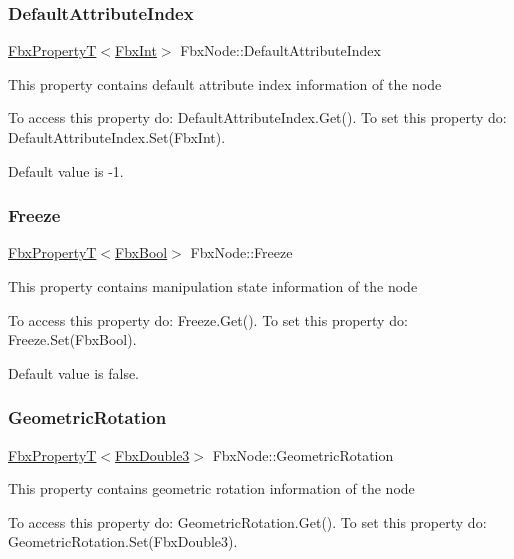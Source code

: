 \subsubsection{\texorpdfstring{Default\+Attribute\+Index}{DefaultAttributeIndex}}
{\footnotesize\ttfamily \hyperlink{class_fbx_property_t}{Fbx\+PropertyT}$<$\hyperlink{fbxtypes_8h_a088fa96de3b0b3ea69f0f6afef525dfb}{Fbx\+Int}$>$ Fbx\+Node\+::\+Default\+Attribute\+Index}

This property contains default attribute index information of the node

To access this property do\+: Default\+Attribute\+Index.\+Get(). To set this property do\+: Default\+Attribute\+Index.\+Set(\+Fbx\+Int).

Default value is -\/1. \mbox{\label{class_fbx_node_a473f1f463eefd348b159ff832d6681a1}} 
\subsubsection{\texorpdfstring{Freeze}{Freeze}}
{\footnotesize\ttfamily \hyperlink{class_fbx_property_t}{Fbx\+PropertyT}$<$\hyperlink{fbxtypes_8h_a92e0562b2fe33e76a242f498b362262e}{Fbx\+Bool}$>$ Fbx\+Node\+::\+Freeze}

This property contains manipulation state information of the node

To access this property do\+: Freeze.\+Get(). To set this property do\+: Freeze.\+Set(\+Fbx\+Bool).

Default value is false. \mbox{\label{class_fbx_node_aa4c18688d7b0590c405af9198e27a678}} 
\subsubsection{\texorpdfstring{Geometric\+Rotation}{GeometricRotation}}
{\footnotesize\ttfamily \hyperlink{class_fbx_property_t}{Fbx\+PropertyT}$<$\hyperlink{fbxtypes_8h_ae0a96f14cde566774c7553aa7523b7a7}{Fbx\+Double3}$>$ Fbx\+Node\+::\+Geometric\+Rotation}

This property contains geometric rotation information of the node

To access this property do\+: Geometric\+Rotation.\+Get(). To set this property do\+: Geometric\+Rotation.\+Set(\+Fbx\+Double3).


